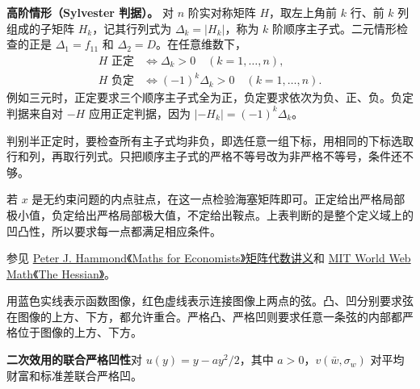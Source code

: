 \begin{tcolorbox}[knowledge,title=海塞矩阵与凹凸性的二阶判别]
\textbf{高阶情形（Sylvester 判据）。} 对 $n$ 阶实对称矩阵 $H$，取左上角前 $k$ 行、前 $k$ 列组成的子矩阵 $H_k$，记其行列式为 $\Delta_k=\lvert H_k\rvert$，称为 $k$ 阶顺序主子式。二元情形检查的正是 $\Delta_1=f_{11}$ 和 $\Delta_2=D$。在任意维数下，
\[
 \begin{aligned}
 H\text{ 正定}
 &\iff \Delta_k>0\quad (k=1,\ldots,n),\\
 H\text{ 负定}
 &\iff (-1)^k\Delta_k>0\quad (k=1,\ldots,n).
 \end{aligned}
\]
例如三元时，正定要求三个顺序主子式全为正，负定要求依次为负、正、负。负定判据来自对 $-H$ 应用正定判据，因为 $\lvert -H_k\rvert=(-1)^k\Delta_k$。

判别半正定时，要检查所有主子式均非负，即选任意一组下标，用相同的下标选取行和列，再取行列式。只把顺序主子式的严格不等号改为非严格不等号，条件还不够。

若 $x$ 是无约束问题的内点驻点，在这一点检验海塞矩阵即可。正定给出严格局部极小值，负定给出严格局部极大值，不定给出鞍点。上表判断的是整个定义域上的凹凸性，所以要求每一点都满足相应条件。

参见 \href{https://web.stanford.edu/~hammond/matrixAlgD20.pdf}{Peter J. Hammond《Maths for Economists》矩阵代数讲义}和 \href{https://web.mit.edu/course/other/wwmath/vectorc/minmax/hessian.html}{MIT World Web Math《The Hessian》}。

\par\smallskip
\noindent\begin{minipage}{\linewidth}
 用蓝色实线表示函数图像，红色虚线表示连接图像上两点的弦。凸、凹分别要求弦在图像的上方、下方，都允许重合。严格凸、严格凹则要求任意一条弦的内部都严格位于图像的上方、下方。

\begin{center}
\begin{minipage}{\linewidth}
\centering
\renewcommand{\thewjFigure}{\thechapter.S\arabic{wjFigure}}%
%
\par
{}
\end{minipage}
\end{center}
\end{minipage}
\end{tcolorbox}

\begin{tcolorbox}[knowledge]
\textbf{二次效用的联合严格凹性}\quad 对 $u(y)=y-ay^2/2$，其中 $a>0$，$v(\bar w,\sigma_w)$ 对平均财富和标准差联合严格凹。
\end{tcolorbox}

